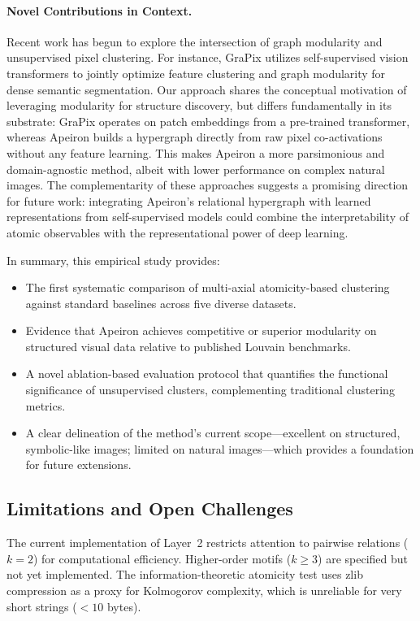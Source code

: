 \paragraph{Novel Contributions in Context.}
Recent work has begun to explore the intersection of graph modularity and unsupervised pixel clustering. For instance, GraPix \cite{grapix2025} utilizes self-supervised vision transformers to jointly optimize feature clustering and graph modularity for dense semantic segmentation. Our approach shares the conceptual motivation of leveraging modularity for structure discovery, but differs fundamentally in its substrate: GraPix operates on patch embeddings from a pre-trained transformer, whereas Apeiron builds a hypergraph directly from raw pixel co-activations without any feature learning. This makes Apeiron a more parsimonious and domain-agnostic method, albeit with lower performance on complex natural images. The complementarity of these approaches suggests a promising direction for future work: integrating Apeiron's relational hypergraph with learned representations from self-supervised models could combine the interpretability of atomic observables with the representational power of deep learning.

In summary, this empirical study provides:
\begin{itemize}
    \item The first systematic comparison of multi-axial atomicity-based clustering against standard baselines across five diverse datasets.
    \item Evidence that Apeiron achieves competitive or superior modularity on structured visual data relative to published Louvain benchmarks.
    \item A novel ablation-based evaluation protocol that quantifies the functional significance of unsupervised clusters, complementing traditional clustering metrics.
    \item A clear delineation of the method's current scope---excellent on structured, symbolic-like images; limited on natural images---which provides a foundation for future extensions.
\end{itemize}

\subsection{Limitations and Open Challenges}

The current implementation of Layer~2 restricts attention to pairwise relations ($k=2$) for computational efficiency. Higher-order motifs ($k \ge 3$) are specified but not yet implemented. The information-theoretic atomicity test uses zlib compression as a proxy for Kolmogorov complexity, which is unreliable for very short strings ($<10$ bytes).

